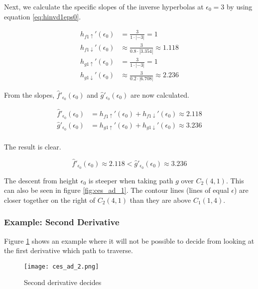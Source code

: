 Next, we calculate the specific slopes of the inverse hyperbolas at $\epsilon_0 = 3$ by using equation \ref{eq:hinvd1eps0}.

\begin{align*}
	h_{f1\uparrow}'(\epsilon_0) &= \frac{3}{1\cdot\left|-3\right|} = 1\\
	h_{f1\downarrow}'(\epsilon_0) &\approx \frac{3}{0.8\cdot\left|3.354\right|} \approx 1.118\\
	h_{g1\uparrow}'(\epsilon_0) &= \frac{3}{1\cdot\left|-3\right|} = 1\\
	h_{g1\downarrow}'(\epsilon_0) &\approx \frac{3}{0.2\cdot\left|6.708\right|} \approx 2.236 
\end{align*}

From the slopes, $\hat{f}'_{\epsilon_0}(\epsilon_0)$ and $\hat{g}'_{\epsilon_0}(\epsilon_0)$ are now calculated.

\begin{align*}
	\hat{f}'_{\epsilon_0}(\epsilon_0) &= h_{f1\uparrow}'(\epsilon_0) + h_{f1\downarrow}'(\epsilon_0) \approx 2.118\\
	\hat{g}'_{\epsilon_0}(\epsilon_0) &= h_{g1\uparrow}'(\epsilon_0) + h_{g1\downarrow}'(\epsilon_0) \approx 3.236\\
\end{align*}

The result is clear.

$$\hat{f}'_{\epsilon_0}(\epsilon_0) \approx 2.118 < \hat{g}'_{\epsilon_0}(\epsilon_0) \approx 3.236$$

The descent from height $\epsilon_0$ is steeper when taking path $g$ over $C_2(4, 1)$. This can also be seen in figure \ref{fig:ces_ad_1}. The contour lines (lines of equal $\epsilon$) are closer together on the right of $C_2(4, 1)$ than they are above $C_1(1, 4)$.


\subsubsection{Example: Second Derivative}

Figure \ref{fig:ces_ad_2} shows an example where it will not be possible to decide from looking at the first derivative which path to traverse.

\begin{figure}[H]
	\centering
    
    \texttt{[image: ces\_ad\_2.png]}
		
	\caption{Second derivative decides\protect\footnotemark}
    \label{fig:ces_ad_2}
\end{figure}

